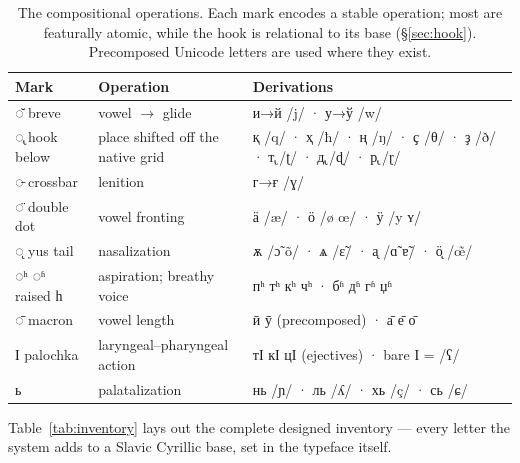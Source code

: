 \documentclass[12pt]{article}
\newcommand{\cz}[1]{{\chu #1}}
\newcommand{\ph}[1]{{\ipafont/#1/}}
\begin{document}
\begin{table}[ht]\centering\small
\begin{tabular}{lll}
\toprule
Mark & Operation & Derivations \\
\midrule
\cz{◌̆} breve & vowel $\rightarrow$ glide & \cz{и→й} \ph{j} · \cz{у→ў} \ph{w} \\
\cz{◌̢} hook below & place shifted off the native grid & \cz{қ} \ph{q} · \cz{ҳ} \ph{ħ} · \cz{ң} \ph{ŋ} · \cz{ҫ} \ph{θ} · \cz{ҙ} \ph{ð} · \cz{т̢} \ph{ʈ} · \cz{д̢} \ph{ɖ} · \cz{р̢} \ph{ɽ} \\
\cz{◌̵} crossbar & lenition & \cz{г→ғ} \ph{ɣ} \\
\cz{◌̈} double dot & vowel fronting & \cz{ӓ} \ph{æ} · \cz{ӧ} \ph{ø œ} · \cz{ӱ} \ph{y ʏ} \\
\cz{◌̨} yus tail & nasalization & \cz{ѫ} \ph{ɔ̃ õ} · \cz{ѧ} \ph{ɛ̃} · \cz{а̨} \ph{ɑ̃ ɐ̃} · \cz{ӧ̨} \ph{œ̃} \\
\cz{◌ʰ ◌ʱ} raised \cz{һ} & aspiration; breathy voice & \cz{пʰ тʰ кʰ чʰ} · \cz{бʱ дʱ гʱ џʱ} \\
\cz{◌̄} macron & vowel length & \cz{ӣ ӯ} (precomposed) · \cz{а̄ е̄ о̄} \\
\cz{Ӏ} palochka & laryngeal--pharyngeal action & \cz{тӀ кӀ цӀ} (ejectives) · bare \cz{Ӏ} = \ph{ʕ} \\
\cz{ь} & palatalization & \cz{нь} \ph{ɲ} · \cz{ль} \ph{ʎ} · \cz{хь} \ph{ç} · \cz{сь} \ph{ɕ} \\
\bottomrule
\end{tabular}
\caption{The compositional operations. Each mark encodes a stable operation; most are featurally atomic, while the hook is relational to its base (\S\ref{sec:hook}). Precomposed Unicode letters are used where they exist.}
\label{tab:grammar}
\end{table}


Table~\ref{tab:inventory} lays out the complete designed inventory — every letter the system adds to a Slavic Cyrillic base, set in the typeface itself.
\end{document}
